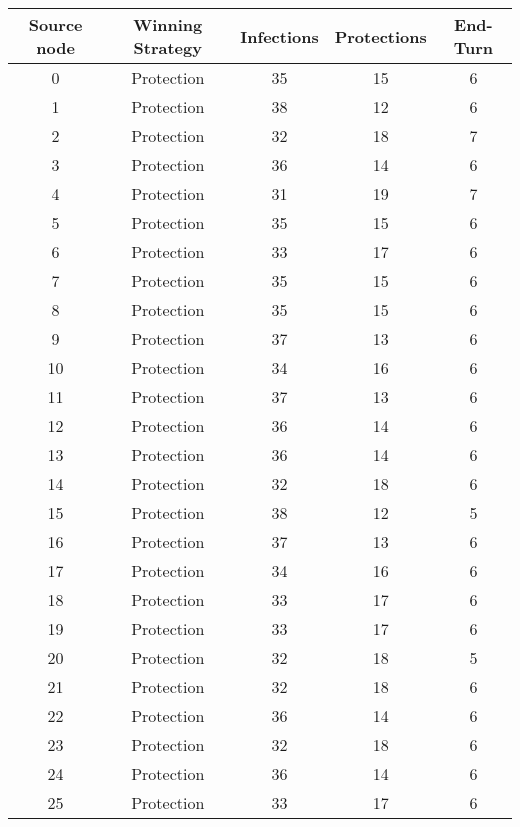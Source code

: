 \documentclass[results.tex]{subfiles}
\begin{document}
\begin{center}
  \begin{tabular}{| c || c | c | c | c |}
    \hline
    {\bfseries Source node} & {\bfseries Winning Strategy} & {\bfseries Infections} & {\bfseries Protections} & {\bfseries End-Turn} \\  %
    \hline\hline
    0 & Protection & 35 & 15 & 6 \\ 
    \hline
    1 & Protection & 38 & 12 & 6 \\ 
    \hline
    2 & Protection & 32 & 18 & 7 \\ 
    \hline
    3 & Protection & 36 & 14 & 6 \\ 
    \hline
    4 & Protection & 31 & 19 & 7 \\ 
    \hline
    5 & Protection & 35 & 15 & 6 \\ 
    \hline
    6 & Protection & 33 & 17 & 6 \\ 
    \hline
    7 & Protection & 35 & 15 & 6 \\ 
    \hline
    8 & Protection & 35 & 15 & 6 \\ 
    \hline
    9 & Protection & 37 & 13 & 6 \\ 
    \hline
    10 & Protection & 34 & 16 & 6 \\ 
    \hline
    11 & Protection & 37 & 13 & 6 \\ 
    \hline
    12 & Protection & 36 & 14 & 6 \\ 
    \hline
    13 & Protection & 36 & 14 & 6 \\ 
    \hline
    14 & Protection & 32 & 18 & 6 \\ 
    \hline
    15 & Protection & 38 & 12 & 5 \\ 
    \hline
    16 & Protection & 37 & 13 & 6 \\ 
    \hline
    17 & Protection & 34 & 16 & 6 \\ 
    \hline
    18 & Protection & 33 & 17 & 6 \\ 
    \hline
    19 & Protection & 33 & 17 & 6 \\ 
    \hline
    20 & Protection & 32 & 18 & 5 \\ 
    \hline
    21 & Protection & 32 & 18 & 6 \\ 
    \hline
    22 & Protection & 36 & 14 & 6 \\ 
    \hline
    23 & Protection & 32 & 18 & 6 \\ 
    \hline
    24 & Protection & 36 & 14 & 6 \\ 
    \hline
    25 & Protection & 33 & 17 & 6 \\ 

\end{tabular}
\end{center}
\end{document}

